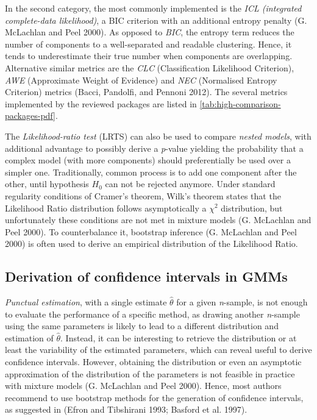 In the second category, the most commonly implemented is the \emph{ICL
(integrated complete-data likelihood)}, a BIC criterion with an
additional entropy penalty (G. McLachlan and Peel 2000). As opposed to \emph{BIC},
the entropy term reduces the number of components to a well-separated
and readable clustering. Hence, it tends to underestimate their true
number when components are overlapping. Alternative similar metrics are
the \emph{CLC} (Classification Likelihood Criterion), \emph{AWE} (Approximate
Weight of Evidence) and \emph{NEC} (Normalised Entropy Criterion) metrics
(Bacci, Pandolfi, and Pennoni 2012). The several metrics implemented by the reviewed
packages are listed in
\ref{tab:high-comparison-packages-pdf}.

The \emph{Likelihood-ratio test} (LRTS) can also be used to compare \emph{nested
models}, with additional advantage to possibly derive a \emph{p}-value
yielding the probability that a complex model (with more components)
should preferentially be used over a simpler one. Traditionally, common
process is to add one component after the other, until hypothesis \(H_0\)
can not be rejected anymore. Under standard regularity conditions of
Cramer's theorem, Wilk's theorem states that the Likelihood Ratio
distribution follows asymptotically a \(\chi^2\) distribution, but
unfortunately these conditions are not met in mixture models
(G. McLachlan and Peel 2000). To counterbalance it, bootstrap inference
(G. McLachlan and Peel 2000) is often used to derive an empirical distribution of
the Likelihood Ratio.

\hypertarget{derivation-of-confidence-intervals-in-gmms}{%
\subsection{Derivation of confidence intervals in GMMs}\label{derivation-of-confidence-intervals-in-gmms}}

\emph{Punctual estimation}, with a single estimate \(\hat{\theta}\) for a given
\emph{n}-sample, is not enough to evaluate the performance of a specific
method, as drawing another \emph{n}-sample using the same parameters is
likely to lead to a different distribution and estimation of
\(\hat{\theta}\). Instead, it can be interesting to retrieve the
distribution or at least the variability of the estimated parameters,
which can reveal useful to derive confidence intervals. However,
obtaining the distribution or even an asymptotic approximation of the
distribution of the parameters is not feasible in practice with mixture
models (G. McLachlan and Peel 2000). Hence, most authors recommend to use
bootstrap methods for the generation of confidence intervals, as
suggested in (Efron and Tibshirani 1993; Basford et al. 1997).

